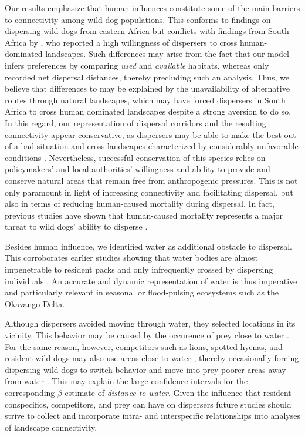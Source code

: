 \documentclass[abstract=on,10pt,a4paper,bibliography=totocnumbered]{article}
\begin{document}
Our results emphasize that human influences constitute some of the main barriers
to connectivity among wild dog populations. This conforms to findings on
dispersing wild dogs from eastern Africa \citep{Masenga.2016, Oneill.2020} but
conflicts with findings from South Africa by \cite{DaviesMostert.2012}, who
reported a high willingness of dispersers to cross human-dominated landscapes.
Such differences may arise from the fact that our model infers preferences by
comparing \textit{used} and \textit{available} habitats, whereas
\cite{DaviesMostert.2012} only recorded net dispersal distances, thereby
precluding such an analysis. Thus, we believe that differences to
\cite{DaviesMostert.2012} may be explained by the unavailability of alternative
routes through natural landscapes, which may have forced dispersers in South
Africa to cross human dominated landscapes despite a strong aversion to do so.
In this regard, our representation of dispersal corridors and the resulting
connectivity appear conservative, as dispersers may be able to make the best out
of a bad situation and cross landscapes characterized by considerably
unfavorable conditions \citep{Palomares.2000, Elliot.2014}. Nevertheless,
successful conservation of this species relies on policymakers' and local
authorities' willingness and ability to provide and conserve natural areas that
remain free from anthropogenic pressures. This is not only paramount in light of
increasing connectivity and facilitating dispersal, but also in terms of
reducing human-caused mortality during dispersal. In fact, previous studies have
shown that human-caused mortality represents a major threat to wild dogs'
ability to disperse \citep{Woodroffe.2019, Cozzi.2020}.

Besides human influence, we identified water as additional obstacle to
dispersal. This corroborates earlier studies showing that water bodies are
almost impenetrable to resident packs \citep{Abrahms.2017} and only infrequently
crossed by dispersing individuals \citep{Cozzi.2020}. An accurate and dynamic
representation of water is thus imperative and particularly relevant in seasonal
or flood-pulsing ecosystems such as the Okavango Delta.

Although dispersers avoided moving through water, they selected locations in its
vicinity. This behavior may be caused by the occurence of prey close to water
\citep{Bonyongo.2005}. For the same reason, however, competitors such as lions,
spotted hyenas, and resident wild dogs may also use areas close to water
\citep{Valeix.2010}, thereby occasionally forcing dispersing wild dogs to switch
behavior and move into prey-poorer areas away from water \citep{Creel.2002,
Mills.1997}. This may explain the large confidence intervals for the
corresponding \(\beta\)-estimate of \textit{distance to water}. Given the
influence that resident conspecifics, competitors, and prey can have on
dispersers \citep{Cozzi.2018, Armansin.2019} future studies should strive to
collect and incorporate intra- and interspecific relationships into analyses of
landscape connectivity.
\end{document}
